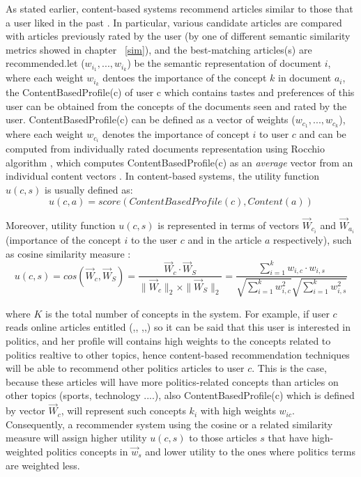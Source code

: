 As stated earlier, content-based systems recommend articles similar to those that a user liked in the past  \citep{recom_56}  \citep{recom_69}  \citep{recom_77}. In particular, various candidate articles are compared with articles previously rated by the user (by one of different semantic similarity metrics showed in chapter ~\ref{sim}), and the best-matching articles(s) are recommended.let ($w_{i_1},...,w_{i_k}$) be the semantic representation of document $i$, where each weight $w_{i_k}$ dentoes the importance of the concept $k$ in document $a_i$, the ContentBasedProfile(c) of user c which contains tastes and preferences of this user can be obtained from  the concepts of the documents seen and rated by the user. ContentBasedProfile(c) can be defined as a vector of weights ($w_{c_1},...,w_{c_k}$), where each weight $w_{c_i}$ denotes the importance of concept $i$ to user $c$ and can be computed from individually rated documents representation using Rocchio algorithm  \citep{recom_85}, which computes ContentBasedProfile(c) as an \textit{average} vector from an individual content vectors  \citep{recom_8}  \citep{recom_56}.
In content-based systems, the utility function $u(c, s)$ is usually defined as:
\begin{equation}\label{eq:5}
u(c,a)= score(ContentBasedProfile(c),Content(a))
\end{equation}


Moreover, utility function $u(c, s)$ is represented in terms of vectors $\vec{W}_{c_i}$   and $\vec{W}_{a_i}$ (importance of the concept $i$ to the user $c$ and in the article $a$ respectively), such as cosine similarity measure \citep{recom_7} \citep{recom_89}:
\begin{equation}\label{eq:6}
	u(c,s) = cos(\vec{W}_c, \vec{W}_S) = \frac{\vec{W}_c \cdot \vec{W}_S}{ \|\vec{W}_c\|_2 \times \|\vec{W}_S\|_2} = 
	\frac{\sum\limits_{i=1}^k w_{i,c} \cdot w_{i,s}}{\sqrt{\sum\limits_{i=1}^k w_{i,c}^2} \sqrt{\sum\limits_{i=1}^k w_{i,s}^2}}
\end{equation}


where $K$ is the total number of concepts in the system.
For example, if user $c$ reads online articles entitled (,, ,,) so it can be said that this user is interested in politics, and her profile will contains high weights to the concepts related to politics realtive to other topics, hence content-based recommendation techniques will be able to recommend other politics articles to user $c$. This is the case, because these articles will have more politics-related concepts than articles on other topics (sports, technology ....), also ContentBasedProfile(c) which is defined by vector $\vec{W}_c$, will represent such concepts $k_i$ with high weights $w_{ic}$. Consequently, a recommender system using the cosine or a related similarity measure will assign higher utility $u(c, s)$ to those articles $s$ that have high-weighted politics concepts in $\vec{w}_s $ and lower utility to the ones where politics terms are weighted less.

